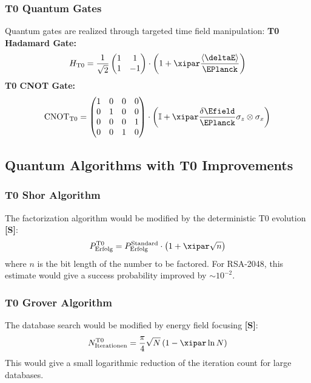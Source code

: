 	\subsubsection{T0 Quantum Gates}
	Quantum gates are realized through targeted time field manipulation:
	\textbf{T0 Hadamard Gate:}
	\begin{equation}
		H_{\text{T0}} = \frac{1}{\sqrt{2}}\begin{pmatrix} 1 & 1 \\ 1 & -1 \end{pmatrix} \cdot \left(1 + \xipar \frac{\langle\deltaE\rangle}{\EPlanck}\right)
	\end{equation}
	\textbf{T0 CNOT Gate:}
	\begin{equation}
		\text{CNOT}_{\text{T0}} = \begin{pmatrix} 1 & 0 & 0 & 0 \\ 0 & 1 & 0 & 0 \\ 0 & 0 & 0 & 1 \\ 0 & 0 & 1 & 0 \end{pmatrix} \cdot \left(\mathbb{I} + \xipar \frac{\delta\Efield}{\EPlanck} \sigma_z \otimes \sigma_x\right)
	\end{equation}
	\subsection{Quantum Algorithms with T0 Improvements}
	\subsubsection{T0 Shor Algorithm}
	The factorization algorithm would be modified by the deterministic T0 evolution \textbf{[S]}:
	\begin{equation}
		P_{\text{Erfolg}}^{\text{T0}} = P_{\text{Erfolg}}^{\text{Standard}} \cdot \left(1 + \xipar \sqrt{n}\right)
	\end{equation}
	where $n$ is the bit length of the number to be factored. For RSA-2048, this estimate would give a success probability improved by $\sim 10^{-2}$.

	\subsubsection{T0 Grover Algorithm}
	The database search would be modified by energy field focusing \textbf{[S]}:
	\begin{equation}
		N_{\text{Iterationen}}^{\text{T0}} = \frac{\pi}{4}\sqrt{N} \left(1 - \xipar \ln N\right)
	\end{equation}
	This would give a small logarithmic reduction of the iteration count for large databases.
